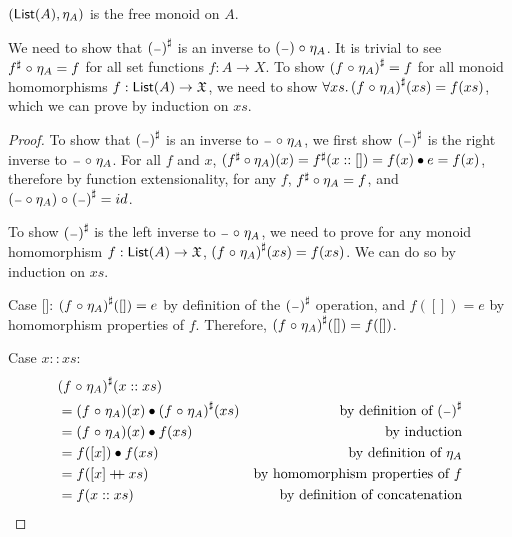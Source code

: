 \begin{propositionrep}
    $(\operatorname{\mathsf{List}}(A),\eta_A)$ is the free monoid on $A$.
\end{propositionrep}

\begin{proofsketch}
    We need to show that ${({\scriptstyle{-}})}^{\sharp}$ is an inverse to $({\scriptstyle{-}}) \mathrel{\circ} \eta_A$.
    It is trivial to see ${f}^{\sharp} \mathrel{\circ} \eta_A = f$ for all set functions $f : A \to X$.
    To show ${(f \mathrel{\circ} \eta_A)}^{\sharp} = f$ for all monoid homomorphisms $f : \operatorname{\mathsf{List}}(A) \to \mathfrak{X}$,
    we need to show $\forall xs.\, {(f \mathrel{\circ} \eta_A)}^{\sharp}(xs) = f(xs)$, which we can prove by induction on $xs$.
\end{proofsketch}

\begin{proof}
    To show that ${({\scriptstyle{-}})}^{\sharp}$ is an inverse to ${\scriptstyle{-}} \mathrel{\circ} \eta_A$,
    we first show ${({\scriptstyle{-}})}^{\sharp}$ is the right inverse to ${\scriptstyle{-}} \mathrel{\circ} \eta_A$.
    For all $f$ and $x$, $({f}^{\sharp} \circ \eta_A)(x) = {f}^{\sharp}(x :: []) = f(x) \mathbin{\bullet} e = f(x)$,
    therefore by function extensionality, for any $f$, ${f}^{\sharp} \circ \eta_A = f$,
    and $({\scriptstyle{-}} \circ \eta_A) \mathrel{\circ} {({\scriptstyle{-}})}^{\sharp} = id$.

    To show ${({\scriptstyle{-}})}^{\sharp}$ is the left inverse to ${\scriptstyle{-}} \mathrel{\circ} \eta_A$, we need to prove
    for any monoid homomorphism $f : \operatorname{\mathsf{List}}(A) \to \mathfrak{X}$, ${(f \mathrel{\circ} \eta_A)}^{\sharp}(xs) = f(xs)$.
    We can do so by induction on $xs$.

    Case []: ${(f \mathrel{\circ} \eta_A)}^{\sharp}([]) = e$ by definition of the ${({\scriptstyle{-}})}^{\sharp}$ operation,
    and $f([]) = e$ by homomorphism properties of $f$. Therefore, ${(f \mathrel{\circ} \eta_A)}^{\sharp}([]) = f([])$.

    Case $x :: xs$:
    \begin{align*}
         & {(f \mathrel{\circ} \eta_A)}^{\sharp}(x :: xs)                                                                   \\
         & = (f \mathrel{\circ} \eta_A)(x) \mathbin{\bullet} {(f \mathrel{\circ} \eta_A)}^{\sharp}(xs) & \text{by definition of ${({\scriptstyle{-}})}^{\sharp}$} \\
         & = (f \mathrel{\circ} \eta_A)(x) \mathbin{\bullet} f(xs)                      & \text{by induction}                      \\
         & = f([x]) \mathbin{\bullet} f(xs)                                   & \text{by definition of $\eta_A$}         \\
         & = f([x] \mathbin{+\kern -0.4em+} xs)                                & \text{by homomorphism properties of $f$} \\
         & = f(x :: xs)                                           & \text{by definition of concatenation}
    \end{align*}


\end{proof}
